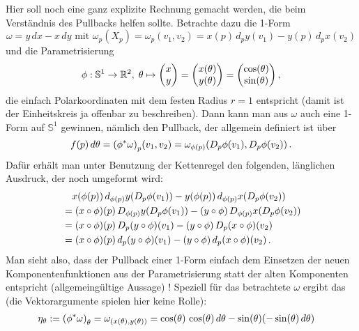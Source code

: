 \documentclass[../H_Analysis_main.tex]{subfiles}
\begin{document}
\begin{bsp}\label{bsp:spherepullback}
Hier soll noch eine ganz explizite Rechnung gemacht werden, die beim Verständnis des Pullbacks helfen sollte. Betrachte dazu die 1-Form
\begin{equation}
\omega = y \, dx - x \, dy \text{ mit } \omega_p(X_p) = \omega_p(v_1, v_2) = x(p) \, d_p y(v_1) - y(p) \, d_p x(v_2)
\end{equation}
und die Parametrisierung
\begin{equation}
\phi: \mathbb{S}^1 \rightarrow \mathbb{R}^2, \; \theta \mapsto \mqty(x \\ y) = \mqty(x(\theta) \\ y(\theta)) = \mqty(\cos(\theta) \\ \sin(\theta)) \, ,
\end{equation}
die einfach Polarkoordinaten mit dem festen Radius $r = 1$ entspricht (damit ist der Einheitskreis ja offenbar zu beschreiben). Dann kann man aus $\omega$ auch eine 1-Form auf $\mathbb{S}^1$ gewinnen, nämlich den Pullback, der allgemein definiert ist über
\begin{equation*}
f(p) \, d\theta = \qty(\phi^* \omega)_p (v_1, v_2) = \omega_{\phi(p)}\qty(D_p \phi(v_1), D_p \phi(v_2)) \, .
\end{equation*}
Dafür erhält man unter Benutzung der Kettenregel den folgenden, länglichen Ausdruck, der noch umgeformt wird:
\begin{align}
& \quad x\qty(\phi(p)) \, d_{\phi(p)} y\qty(D_p \phi(v_1)) - y\qty(\phi(p)) \, d_{\phi(p)} x\qty(D_p \phi(v_2))
\notag\\
&= \qty(x \circ \phi)(p) \, D_{\phi(p)} y \qty(D_p \phi(v_1)) - \qty(y \circ \phi) \, D_{\phi(p)} x \qty(D_p \phi(v_2))
\notag\\
&= \qty(x \circ \phi)(p) \, D_p \qty(y \circ \phi)(v_1) - \qty(y \circ \phi) \, D_p \qty(x \circ \phi)(v_2)
\notag\\
&= \qty(x \circ \phi)(p) \, d_p \qty(y \circ \phi)(v_1) - \qty(y \circ \phi) \, d_p \qty(x \circ \phi)(v_2) \, .
\end{align}
Man sieht also, dass der Pullback einer 1-Form einfach dem Einsetzen der neuen Komponentenfunktionen aus der Parametrisierung statt der alten Komponenten entspricht (allgemeingültige Aussage) ! Speziell für das betrachtete $\omega$ ergibt das (die Vektorargumente spielen hier keine Rolle):
\begin{align}
\eta_\theta &:= \qty(\phi^*\omega)_\theta = \omega_{(x(\theta), y(\theta))} = \cos(\theta) \, \cos(\theta) \, d\theta - \sin(\theta) \qty(-\sin(\theta) \, d\theta)

\end{align}
\end{bsp}
\end{document}
